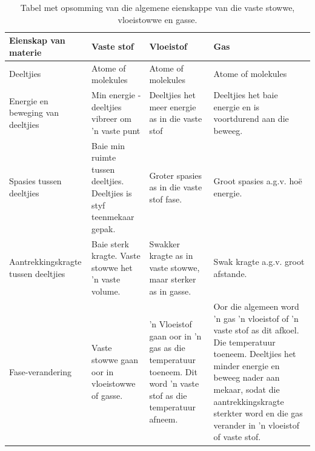 \begin{table}[h]
\begin{center}
\caption{Tabel met opsomming van die algemene eienskappe van die vaste stowwe, vloeistowwe en gasse.}
\label{tab:microscopic:kinetic theory}
\begin{tabular}{|p{3cm}|p{3cm}|p{3cm}|p{3cm}|}\hline
\textbf{Eienskap van materie} & \textbf{Vaste stof} & \textbf{Vloeistof} & \textbf{Gas} \\\hline
Deeltjies & Atome of molekules & Atome of molekules & Atome of molekules \\\hline
Energie en beweging van deeltjies & Min energie - deeltjies vibreer om 'n vaste punt & Deeltjies het meer energie as in die vaste stof & Deeltjies het baie energie en is voortdurend aan die beweeg.  \\\hline
Spasies tussen  deeltjies & Baie min ruimte tussen deeltjies. Deeltjies is styf teenmekaar gepak. & Groter spasies as in die vaste stof fase. & Groot spasies a.g.v. ho\"{e} energie.  \\\hline
Aantrekkingskragte tussen deeltjies & Baie sterk kragte. Vaste stowwe het   'n vaste volume. & Swakker kragte as in vaste stowwe, maar sterker as in gasse. & Swak kragte a.g.v. groot afstande. \\\hline
Fase-verandering & Vaste stowwe gaan oor in vloeistowwe of gasse. &  'n Vloeistof gaan oor in  'n gas as die temperatuur toeneem. Dit word  'n vaste stof as die temperatuur afneem. & Oor die algemeen word  'n gas  'n vloeistof of  'n vaste stof as dit afkoel. Die temperatuur toeneem. Deeltjies het minder energie en beweeg nader aan mekaar, sodat die aantrekkingskragte sterkter word en die gas verander in   'n vloeistof of vaste stof.  \\\hline
\end{tabular}
\end{center}
\end{table}
    \par
